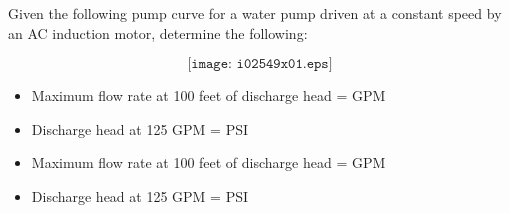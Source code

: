 

Given the following pump curve for a water pump driven at a constant speed by an AC induction motor, determine the following:

$$\texttt{[image: i02549x01.eps]}$$

\begin{itemize}
\item{} Maximum flow rate at 100 feet of discharge head = \underbar{\hskip 50pt} GPM
\vskip 5pt
\item{} Discharge head at 125 GPM = \underbar{\hskip 50pt} PSI
\end{itemize}







\begin{itemize}
\item{} Maximum flow rate at 100 feet of discharge head =  GPM
\item{} Discharge head at 125 GPM =  PSI
\end{itemize}











